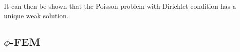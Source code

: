 It can then be shown that the Poisson problem with Dirichlet condition has a unique weak solution.




\subsection{$\phi$-FEM}



